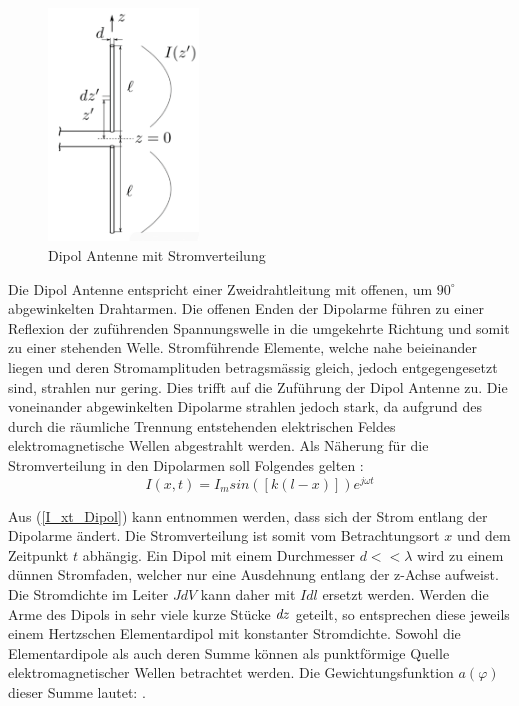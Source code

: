 \begin{figure}[!ht]
	\centering
	\includegraphics[width=4cm]{content/bilder/Dipol_EMANT_S42.pdf}%
	\caption{Dipol Antenne mit Stromverteilung \cite{Tekom}}
	\label{FitzDipol}
\end{figure}
Die Dipol Antenne entspricht einer Zweidrahtleitung mit offenen, um $90^\circ$ abgewinkelten Drahtarmen. Die offenen Enden der Dipolarme führen zu einer Reflexion der zuführenden Spannungswelle in die umgekehrte Richtung und somit zu einer stehenden Welle. Stromführende Elemente, welche nahe beieinander liegen und deren Stromamplituden betragsmässig gleich, jedoch entgegengesetzt sind, strahlen nur gering. Dies trifft auf die Zuführung der Dipol Antenne zu. Die voneinander abgewinkelten Dipolarme strahlen jedoch stark, da aufgrund des durch die räumliche Trennung entstehenden elektrischen Feldes elektromagnetische Wellen abgestrahlt werden.
Als Näherung für die Stromverteilung in den Dipolarmen soll Folgendes gelten \cite{elliott1981antenna}:
\begin{equation}\label{I_xt_Dipol} 
I(x,t) =I_{m}sin([k(l-x)])e^{j\omega t}
\end{equation}

Aus  (\ref{I_xt_Dipol}) kann entnommen werden, dass sich der Strom entlang der Dipolarme ändert. Die Stromverteilung ist somit vom Betrachtungsort $x$ und dem Zeitpunkt $t$ abhängig. Ein Dipol mit einem Durchmesser $d<<\lambda$ wird  zu einem dünnen Stromfaden, welcher nur eine Ausdehnung entlang der z-Achse aufweist. Die Stromdichte im Leiter $J \textit{d}V$ kann daher mit $I\textit{d}l$ ersetzt werden. Werden die Arme des Dipols in sehr viele kurze Stücke $\textit{\textit{d}}z$ geteilt, so entsprechen diese jeweils einem Hertzschen Elementardipol mit konstanter Stromdichte. Sowohl die Elementardipole als auch deren Summe können als punktförmige Quelle elektromagnetischer Wellen betrachtet werden. Die Gewichtungsfunktion $a(\varphi)$ dieser Summe lautet: \cite{elliott1981antenna}.\\

